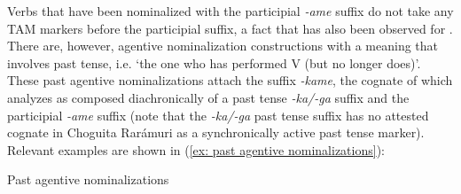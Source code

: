     \z
\z

Verbs that have been nominalized with the participial \textit{-ame} suffix do not take any TAM markers before the participial suffix, a fact that has also been observed for  \citep[][180]{miller1996guarijio}. There are, however, agentive nominalization constructions with a meaning that involves past tense, i.e. ‘the one who has performed V (but no longer does)’. These past agentive nominalizations attach the suffix \textit{-kame}, the cognate of which \citet{miller1996guarijio} analyzes as composed diachronically of a past tense \textit{-ka/-ga} suffix and the participial \textit{-ame} suffix (note that the  \textit{-ka/-ga} past tense suffix has no attested cognate in Choguita Rarámuri as a synchronically active past tense marker). Relevant examples are shown in (\ref{ex: past agentive nominalizations}):

\ea\label{ex: past agentive nominalizations}
{Past agentive nominalizations}\\


